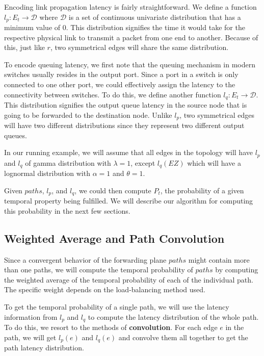 \documentclass[10pt,sigconf,letterpaper,anonymous,nonacm]{acmart}
\begin{document}
Encoding link propagation latency is fairly straightforward. 
We define a function $l_p: E_t \rightarrow \mathcal{D}$ where $\mathcal{D}$ is a set of 
continuous univariate distribution that has a minimum value of $0$.
This distribution signifies the time it would take for the respective physical link to transmit 
a packet from one end to another.
Because of this, just like $r$, two symmetrical edges will share the same distribution.

To encode queuing latency, we first note that the queuing mechanism in modern switches 
usually resides in the output port. %
Since a port in a switch is only connected to one other port, we could effectively 
assign the latency to the connectivity between switches.
To do this, we define another function $l_q: E_t \rightarrow \mathcal{D}$.
This distribution signifies the output queue latency in the source node that is 
going to be forwarded to the destination node.
Unlike $l_p$, two symmetrical edges will have two different distributions since they 
represent two different output queues.

In our running example, we will assume that all edges in the topology will have $l_p$
and $l_q$ of gamma distribution with $\lambda = 1$, except $l_q(EZ)$ which will 
have a lognormal distribution with $\alpha = 1$ and $\theta = 1$.

Given $paths$, $l_p$, and $l_q$, we could then compute $P_t$, the probability of a 
given temporal property being fulfilled.
We will describe our algorithm for computing this probability in the next few 
sections.

\subsection{Weighted Average and Path Convolution}
Since a convergent behavior of the forwarding plane $paths$ might contain more than 
one paths, we will compute the temporal probability of $paths$ by computing the 
weighted average of the temporal probability of each of the individual path.
The specific weight depends on the load-balancing method used.

To get the temporal probability of a single path, we will use the latency information 
from $l_p$ and $l_q$ to compute the latency distribution of the whole path.
To do this, we resort to the methods of \textbf{convolution}.
For each edge $e$ in the path, we will get $l_p(e)$ and $l_q(e)$ and convolve them 
all together to get the path latency distribution.
\end{document}
